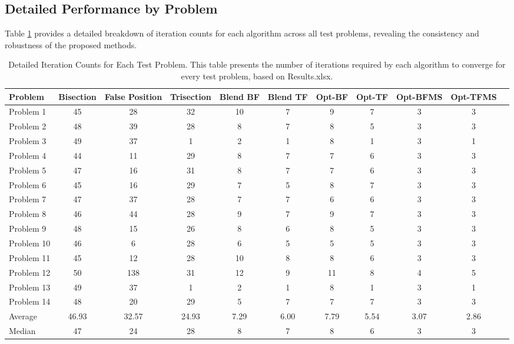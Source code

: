 \documentclass[amsmath, amssymb, aps]{revtex4-2}
\begin{document}
\subsection{Detailed Performance by Problem}

Table \ref{tab:detailed_results} provides a detailed breakdown of iteration counts for each algorithm across all test problems, revealing the consistency and robustness of the proposed methods.

\begin{table}[H]
\centering
\caption{Detailed Iteration Counts for Each Test Problem. This table presents the number of iterations required by each algorithm to converge for every test problem, based on Results.xlsx.}
\label{tab:detailed_results}
\begin{tabular}{lcccccccccc}
\toprule
Problem & Bisection & False Position & Trisection & Blend BF & Blend TF & Opt-BF & Opt-TF & Opt-BFMS & Opt-TFMS \\
\midrule
Problem 1  & 45 & 28 & 32 & 10 & 7 & 9 & 7 & 3 & 3 \\
Problem 2  & 48 & 39 & 28 & 8  & 7 & 8 & 5 & 3 & 3 \\
Problem 3  & 49 & 37 & 1  & 2  & 1 & 8 & 1 & 3 & 1 \\
Problem 4  & 44 & 11 & 29 & 8  & 7 & 7 & 6 & 3 & 3 \\
Problem 5  & 47 & 16 & 31 & 8  & 7 & 7 & 6 & 3 & 3 \\
Problem 6  & 45 & 16 & 29 & 7  & 5 & 8 & 7 & 3 & 3 \\
Problem 7  & 47 & 37 & 28 & 7  & 7 & 6 & 6 & 3 & 3 \\
Problem 8  & 46 & 44 & 28 & 9  & 7 & 9 & 7 & 3 & 3 \\
Problem 9  & 48 & 15 & 26 & 8  & 6 & 8 & 5 & 3 & 3 \\
Problem 10 & 46 & 6  & 28 & 6  & 5 & 5 & 5 & 3 & 3 \\
Problem 11 & 45 & 12 & 28 & 10 & 8 & 8 & 6 & 3 & 3 \\
Problem 12 & 50 & 138& 31 & 12 & 9 & 11& 8 & 4 & 5 \\
Problem 13 & 49 & 37 & 1  & 2  & 1 & 8 & 1 & 3 & 1 \\
Problem 14 & 48 & 20 & 29 & 5  & 7 & 7 & 7 & 3 & 3 \\
\midrule
Average   & 46.93 & 32.57 & 24.93 & 7.29 & 6.00 & 7.79 & 5.54 & 3.07 & 2.86 \\
Median    & 47    & 24    & 28    & 8    & 7    & 8    & 6    & 3    & 3    \\
\bottomrule
\end{tabular}
\end{table}
\end{document}
